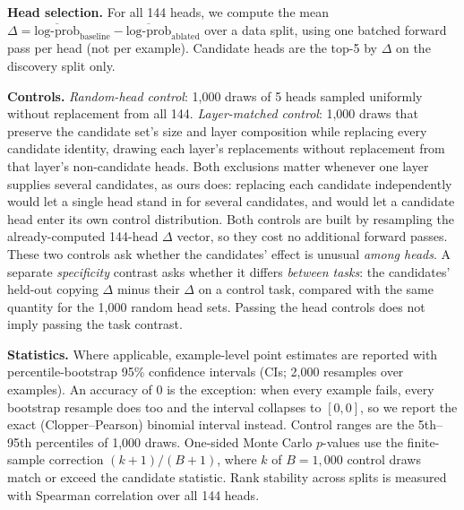 \documentclass{article}
\begin{document}
\textbf{Head selection.} For all 144 heads, we compute the mean
$\Delta = \overline{\text{log-prob}}_{\text{baseline}} -
\overline{\text{log-prob}}_{\text{ablated}}$ over a data split, using
one batched forward pass per head (not per example). Candidate heads
are the top-5 by $\Delta$ on the discovery split only.

\textbf{Controls.} \emph{Random-head control}: 1{,}000 draws of 5 heads
sampled uniformly without replacement from all 144. \emph{Layer-matched
control}: 1{,}000 draws that preserve the candidate set's size and layer
composition while replacing every candidate identity, drawing each
layer's replacements without replacement from that layer's
non-candidate heads. Both exclusions matter whenever one layer supplies
several candidates, as ours does: replacing each candidate independently
would let a single head stand in for several candidates, and would let a
candidate head enter its own control distribution. Both controls are
built by resampling the already-computed 144-head $\Delta$ vector, so
they cost no additional forward passes. These two controls ask whether
the candidates' effect is unusual \emph{among heads}. A separate
\emph{specificity} contrast asks whether it differs \emph{between
tasks}: the candidates' held-out copying $\Delta$ minus their $\Delta$ on
a control task, compared with the same quantity for the 1{,}000 random
head sets. Passing the head controls does not imply passing the task
contrast.

\textbf{Statistics.} Where applicable, example-level point estimates are
reported with percentile-bootstrap 95\% confidence intervals (CIs;
2{,}000 resamples over examples). An accuracy of 0 is the exception:
when every example fails, every bootstrap resample does too and the
interval collapses to $[0,0]$, so we report the exact (Clopper--Pearson)
binomial interval instead. Control ranges are the 5th--95th
percentiles of 1{,}000 draws. One-sided Monte Carlo $p$-values use the
finite-sample correction $(k+1)/(B+1)$, where $k$ of $B=1{,}000$ control
draws match or exceed the candidate statistic. Rank stability across
splits is measured with Spearman correlation over all 144 heads.
\end{document}
